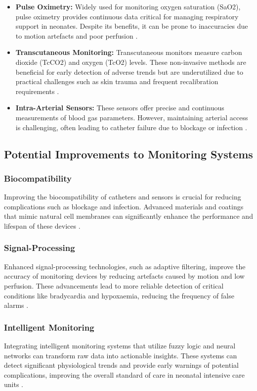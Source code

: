\documentclass[12pt,journal,compsoc]{IEEEtran}
\begin{document}
\begin{itemize}
    \item \textbf{Pulse Oximetry:} Widely used for monitoring oxygen saturation (SaO2), pulse oximetry provides continuous data critical for managing respiratory support in neonates. Despite its benefits, it can be prone to inaccuracies due to motion artefacts and poor perfusion \cite{IEEEhowto:nicklin}.
    \item \textbf{Transcutaneous Monitoring:} Transcutaneous monitors measure carbon dioxide (TcCO2) and oxygen (TcO2) levels. These non-invasive methods are beneficial for early detection of adverse trends but are underutilized due to practical challenges such as skin trauma and frequent recalibration requirements \cite{IEEEhowto:nicklin}.
    \item \textbf{Intra-Arterial Sensors:} These sensors offer precise and continuous measurements of blood gas parameters. However, maintaining arterial access is challenging, often leading to catheter failure due to blockage or infection \cite{IEEEhowto:nicklin}.
\end{itemize}

\subsection{Potential Improvements to Monitoring Systems}

\subsubsection{Biocompatibility}
Improving the biocompatibility of catheters and sensors is crucial for reducing complications such as blockage and infection. Advanced materials and coatings that mimic natural cell membranes can significantly enhance the performance and lifespan of these devices \cite{IEEEhowto:nicklin}.

\subsubsection{Signal-Processing}
Enhanced signal-processing technologies, such as adaptive filtering, improve the accuracy of monitoring devices by reducing artefacts caused by motion and low perfusion. These advancements lead to more reliable detection of critical conditions like bradycardia and hypoxaemia, reducing the frequency of false alarms \cite{IEEEhowto:nicklin}.

\subsubsection{Intelligent Monitoring}
Integrating intelligent monitoring systems that utilize fuzzy logic and neural networks can transform raw data into actionable insights. These systems can detect significant physiological trends and provide early warnings of potential complications, improving the overall standard of care in neonatal intensive care units \cite{IEEEhowto:nicklin}.
\end{document}
